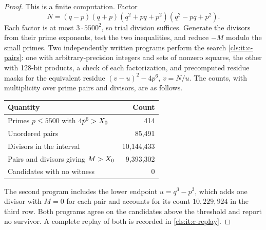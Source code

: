 \begin{proof}
This is a finite computation. Factor
\[
 N=(q-p)(q+p)(q^2+pq+p^2)(q^2-pq+p^2).
\]
Each factor is at most $3\cdot5500^2$, so trial division suffices. Generate the divisors
from their prime exponents, test the two inequalities, and reduce $-M$ modulo the small
primes. Two independently written programs perform the search \ref{cls:it:c-pairs}: one
with arbitrary-precision integers and sets of nonzero squares, the other with 128-bit
products, a check of each factorization, and precomputed residue masks for the equivalent
residue $(v-u)^2-4p^6$, $v=N/u$. The counts, with multiplicity over prime pairs and
divisors, are as follows.
\begin{center}
\begin{tabular}{lr}\toprule
Quantity & Count\\\midrule
Primes $p\le5500$ with $4p^6>X_0$ & 414\\
Unordered pairs & 85{,}491\\
Divisors in the interval & 10{,}144{,}433\\
Pairs and divisors giving $M>X_0$ & 9{,}393{,}302\\
Candidates with no witness & 0\\\bottomrule
\end{tabular}
\end{center}
The second program includes the lower endpoint $u=q^3-p^3$, which adds one divisor with
$M=0$ for each pair and accounts for its count $10{,}229{,}924$ in the third row. Both
programs agree on the candidates above the threshold and report no survivor. A complete
replay of both is recorded in \ref{cls:it:c-replay}.
\end{proof}

